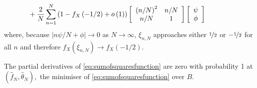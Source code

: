 \documentclass[journal]{IEEEtran}
\begin{document}
\begin{IEEEproof}
\begin{align*}
&\hspace{-0.9cm}+\frac{2}{N}\sum_{n=1}^{N}\left(  1-f_X \left( -1/2\right)  +o\left(  1\right) \right)  
\left[ \begin{array}[c]{cc}%
\left(  n/N\right)  ^{2} & n/N\\
n/N & 1
\end{array} \right]  
\left[ \begin{array}[c]{c}%
\psi\\
\phi
\end{array}
\right]
\end{align*}
where, because $|n\psi/N+\phi| \rightarrow 0$ as $N\rightarrow\infty$, $\xi_{n,N}$ approaches either $\nicefrac{1}{2}$ or $-\nicefrac{1}{2}$ for all $n$ and therefore $f_X\left(\xi_{n,N}\right) \rightarrow f_X\left( -1/2 \right)$.
\end{IEEEproof}

\begin{lemma}
\label{lem:part}The partial derivatives of \eqref{eq:sumofsquaresfunction} are
zero with probability 1 at $\left(  \widehat{f}_{N},\widehat{\theta}_{N}\right)  ,$ the minimiser
of \eqref{eq:sumofsquaresfunction} over $B$.
\end{lemma}
\end{document}
